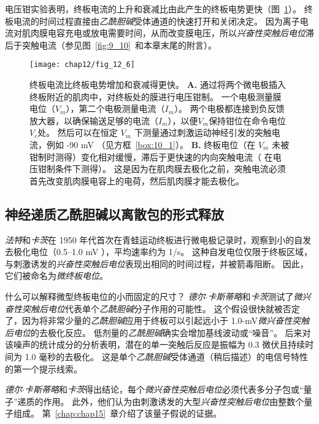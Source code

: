 电压钳实验表明，终板电流的上升和衰减比由此产生的终板电势更快（图~\ref{fig:12_6}）。
终板电流的时间过程直接由\textit{乙酰胆碱}受体通道的快速打开和关闭决定。
因为离子电流对肌肉膜电容充电或放电需要时间，从而改变膜电压，所以\textit{兴奋性突触后电位}滞后于突触电流（参见图~\ref{fig:9_10}~和本章末尾的附言）。


\begin{figure}[htbp]
	\centering
	\texttt{[image: chap12/fig\_12\_6]}
	\caption{终板电流比终板电势增加和衰减得更快。
		\textbf{A.} 通过将两个微电极插入终板附近的肌肉中，对终板处的膜进行电压钳制。
		一个电极测量膜电位（$V_m$），第二个电极测量电流（$I_m$）。
		两个电极都连接到负反馈放大器，以确保输送足够的电流（$I_m$），以便$V_m$保持钳位在命令电位 $V_c$处。
		然后可以在恒定 $V_m$ 下测量通过刺激运动神经引发的突触电流，例如 -90 mV （见方框~\ref{box:10_1}）。
		\textbf{B.} 终板电位（在 $V_m$ 未被钳制时测得）变化相对缓慢，滞后于更快速的内向突触电流（ 在电压钳制条件下测得）。
		这是因为在肌肉膜去极化之前，突触电流必须首先改变肌肉膜电容上的电荷，然后肌肉膜才能去极化。}
	\label{fig:12_6}
\end{figure}



\subsection{神经递质乙酰胆碱以离散包的形式释放}

\textit{法特}和\textit{卡茨}在 1950 年代首次在青蛙运动终板进行微电极记录时，观察到小的自发去极化电位（0.5–1.0 mV ），平均速率约为 1/s。 
这种自发电位仅限于终板区域，与刺激诱发的\textit{兴奋性突触后电位}表现出相同的时间过程，并被箭毒阻断。 
因此，它们被命名为\textit{微终板电位}。


什么可以解释微型终板电位的小而固定的尺寸？ 
\textit{德尔$\cdot$卡斯蒂略}和\textit{卡茨}测试了\textit{微兴奋性突触后电位}代表单个\textit{乙酰胆碱}分子作用的可能性。
这个假设很快就被否定了，因为将非常少量的\textit{乙酰胆碱}应用于终板可以引起远小于 1.0-mV\textit{微兴奋性突触后电位}的去极化反应。 
低剂量的\textit{乙酰胆碱}确实会增加基线波动或“噪音”。 
后来对该噪声的统计成分的分析表明，潜在的单一突触后反应是振幅为 0.3 微伏且持续时间为 1.0 毫秒的去极化。 
这是单个\textit{乙酰胆碱}受体通道（稍后描述）的电信号特性的第一个提示线索。


\textit{德尔$\cdot$卡斯蒂略}和\textit{卡茨}得出结论，每个\textit{微兴奋性突触后电位}必须代表多分子包或“量子”递质的作用。 
此外，他们认为由刺激诱发的大型\textit{兴奋性突触后电位}由整数个量子组成。 
第~\ref{chap:chap15}~章介绍了该量子假说的证据。



